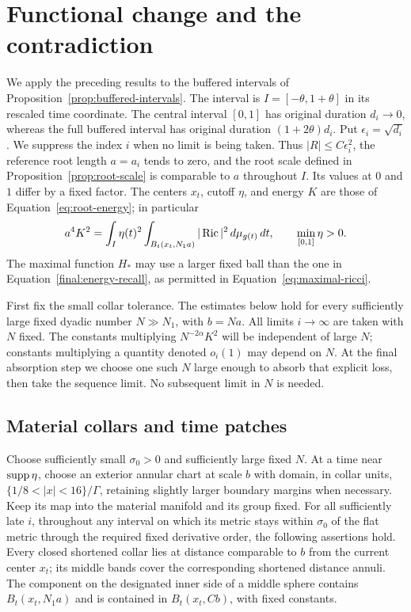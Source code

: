 \section{Functional change and the contradiction}\label{sec:contradiction}

We apply the preceding results to the buffered intervals of
Proposition~\ref{prop:buffered-intervals}.  The interval is
$I=[-\theta,1+\theta]$ in its rescaled time coordinate.  The central
interval $[0,1]$ has original duration $d_i\to0$, whereas the full
buffered interval has original duration $(1+2\theta)d_i$.
Put $\epsilon_i=\sqrt{d_i}$.  We suppress the index $i$ when no limit
is being taken.  Thus $|R|\le C\epsilon_i^2$,
the reference root length $a=a_i$ tends to zero, and the root scale
defined in Proposition~\ref{prop:root-scale} is comparable to $a$
throughout $I$.  Its values at $0$ and $1$ differ by a fixed factor.
The centers $x_t$, cutoff $\eta$, and energy $K$ are those of
Equation~\eqref{eq:root-energy}; in particular
\begin{equation}\label{final:energy-recall}
 a^4 K^2=\int_I\eta(t)^2
       \int_{B_t(x_t,N_1a)}|\operatorname{Ric}|^2\,d\mu_{g(t)}\,dt,
 \qquad \min_{[0,1]}\eta>0.
\end{equation}
The maximal function $H_*$ may use a larger fixed ball than the one in
Equation~\eqref{final:energy-recall}, as permitted in
Equation~\eqref{eq:maximal-ricci}.

First fix the small collar tolerance.  The estimates below hold for
every sufficiently large fixed dyadic number $N\gg N_1$, with
$b=Na$.  All limits $i\to\infty$ are taken with $N$ fixed.
The constants multiplying $N^{-2\alpha}K^2$ will be independent of
large $N$; constants multiplying a quantity denoted $o_i(1)$ may depend
on $N$.  At the final absorption step we choose one such $N$ large
enough to absorb that explicit loss, then take the sequence limit.
No subsequent limit in $N$ is needed.

\subsection{Material collars and time patches}

\begin{lemma}
\label{final:collar-position}
Choose sufficiently small $\sigma_0>0$ and sufficiently large fixed
$N$.  At a time near $\operatorname{supp}\eta$, choose an exterior annular chart at
scale $b$ with domain, in collar units,
$\{1/8<|x|<16\}/\Gamma$, retaining slightly larger boundary margins
when necessary.  Keep its map into the material manifold and its group
fixed.  For all sufficiently late $i$, throughout any interval on
which its metric stays within $\sigma_0$ of the flat metric through the
required fixed derivative order, the following assertions hold.
Every closed shortened collar lies at distance comparable to $b$
from the current center $x_t$; its middle bands cover the corresponding
shortened distance annuli.  The component on the designated inner side
of a middle sphere contains $B_t(x_t,N_1a)$ and is contained in
$B_t(x_t,Cb)$, with fixed constants.
\end{lemma}

